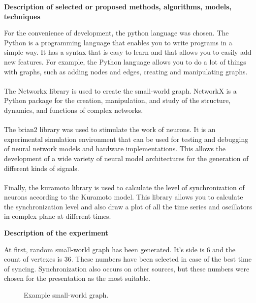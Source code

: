 \documentclass[draft]{article}
\newcommand\tab[1][1cm]{\hspace*{#1}}
\begin{document}
\begin{center}
\textbf{Description of selected or proposed methods, algorithms, models, techniques}\\
\end{center}
\tab For the convenience of development, the python language was chosen. The Python is a programming language that enables you to write programs in a simple way. It has a syntax that is easy to learn and that allows you to easily add new features. For example, the Python language allows you to do a lot of things with graphs, such as adding nodes and edges, creating and manipulating graphs.\\
~\\
\tab The Networkx library is used to create the small-world graph. NetworkX is a Python package for the creation, manipulation, and study of the structure, dynamics, and functions of complex networks.\\
~\\
\tab The brian2 library was used to stimulate the work of neurons. It is an experimental simulation environment that can be used for testing and debugging of neural network models and hardware implementations. This allows the development of a wide variety of neural model architectures for the generation of different kinds of signals.\\
~\\
\tab Finally, the kuramoto library\cite{litlink9} is used to calculate the level of synchronization of neurons according to the Kuramoto model. This library allows you to calculate the synchronization level and also draw a plot of all the time series and oscillators in complex plane at different times.\\
\begin{center}
\textbf{Description of the experiment}\\
\end{center}
\tab At first, random small-world graph has been generated. It's side is 6 and the count of vertexes is 36. These numbers have been selected in case of the best time of syncing. Synchronization also occurs on other sources, but these numbers were chosen for the presentation as the most suitable.
\begin{figure}[h]
\caption{Example small-world graph.}
\label{ris:image}
\end{figure}\\
\end{document}
